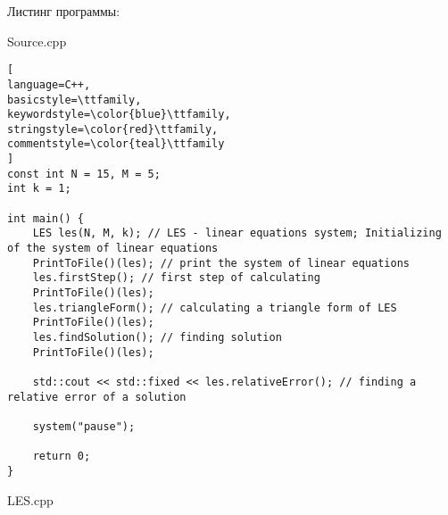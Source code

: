 \documentclass[a4paper, 12pt]{article}
\begin{document}
\normalsize Листинг программы:

Source.cpp

\scriptsize
\begin{lstlisting}[
language=C++,
basicstyle=\ttfamily,
keywordstyle=\color{blue}\ttfamily,
stringstyle=\color{red}\ttfamily,
commentstyle=\color{teal}\ttfamily
]
const int N = 15, M = 5;
int k = 1;

int main() {
	LES les(N, M, k); // LES - linear equations system; Initializing of the system of linear equations
	PrintToFile()(les); // print the system of linear equations
	les.firstStep(); // first step of calculating
	PrintToFile()(les);
	les.triangleForm(); // calculating a triangle form of LES
	PrintToFile()(les);
	les.findSolution(); // finding solution
	PrintToFile()(les);
	
	std::cout << std::fixed << les.relativeError(); // finding a relative error of a solution
	
	system("pause");
	
	return 0;
}
\end{lstlisting}

\normalsize LES.cpp
\end{document}
